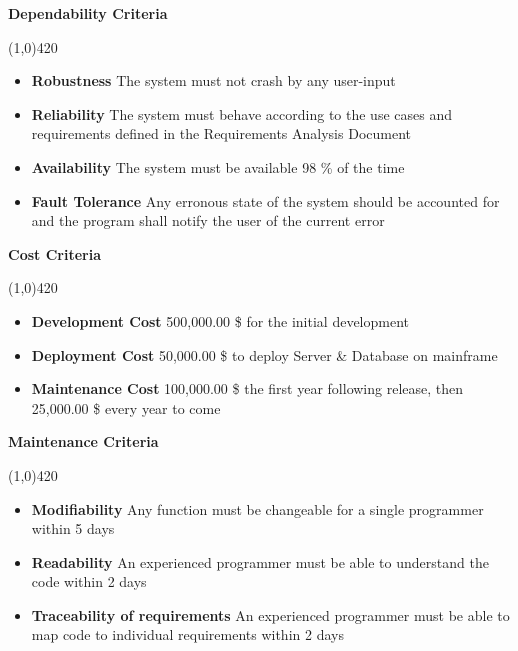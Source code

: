\vspace{0.5cm}

\textbf{Dependability Criteria}
\vspace{-1.1cm}
\begin{center}
\line(1,0){420}
\end{center}
\begin{itemize}
\item \textbf{Robustness} The system must not crash by any user-input
\item \textbf{Reliability} The system must behave according to the use cases and requirements defined in the Requirements Analysis Document
\item \textbf{Availability} The system must be available 98 \% of the time
\item \textbf{Fault Tolerance} Any erronous state of the system should be accounted for and the program shall notify the user of the current error
\end{itemize}



\textbf{Cost Criteria}
\vspace{-1.1cm}
\begin{center}
\line(1,0){420}
\end{center}
\begin{itemize}
\item \textbf{Development Cost}  500,000.00 \$ for the initial development
\item \textbf{Deployment Cost}  50,000.00 \$ to deploy Server \& Database on mainframe
\item \textbf{Maintenance Cost}  100,000.00 \$ the first year following release, then 25,000.00 \$ every year to come
\end{itemize}

\vspace{0.5cm}

\textbf{Maintenance Criteria}
\vspace{-1.1cm}
\begin{center}
\line(1,0){420}
\end{center}
\begin{itemize}
\item \textbf{Modifiability} Any function must be changeable for a single programmer within 5 days
\item \textbf{Readability} An experienced programmer must be able to understand the code within 2 days
\item \textbf{Traceability of requirements} An experienced programmer must be able to map code to individual requirements within 2 days
\end{itemize}

